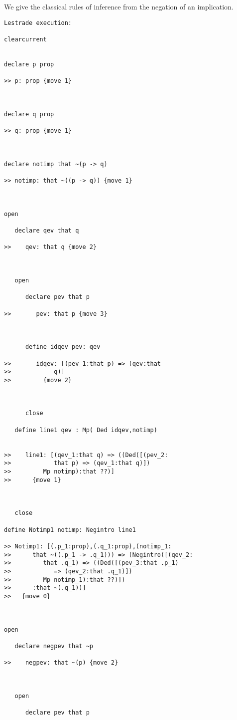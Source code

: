 \documentclass[12pt]{article}
\begin{document}
We give the classical rules of inference from the negation of an implication.

\begin{verbatim}Lestrade execution:

clearcurrent


declare p prop

>> p: prop {move 1}



declare q prop

>> q: prop {move 1}



declare notimp that ~(p -> q)

>> notimp: that ~((p -> q)) {move 1}



open

   declare qev that q

>>    qev: that q {move 2}



   open

      declare pev that p

>>       pev: that p {move 3}



      define idqev pev: qev

>>       idqev: [(pev_1:that p) => (qev:that
>>            q)]
>>         {move 2}



      close

   define line1 qev : Mp( Ded idqev,notimp)


>>    line1: [(qev_1:that q) => ((Ded([(pev_2:
>>            that p) => (qev_1:that q)])
>>         Mp notimp):that ??)]
>>      {move 1}



   close

define Notimp1 notimp: Negintro line1

>> Notimp1: [(.p_1:prop),(.q_1:prop),(notimp_1:
>>      that ~((.p_1 -> .q_1))) => (Negintro([(qev_2:
>>         that .q_1) => ((Ded([(pev_3:that .p_1)
>>            => (qev_2:that .q_1)])
>>         Mp notimp_1):that ??)])
>>      :that ~(.q_1))]
>>   {move 0}



open

   declare negpev that ~p

>>    negpev: that ~(p) {move 2}



   open

      declare pev that p


\end{verbatim}
\end{document}
